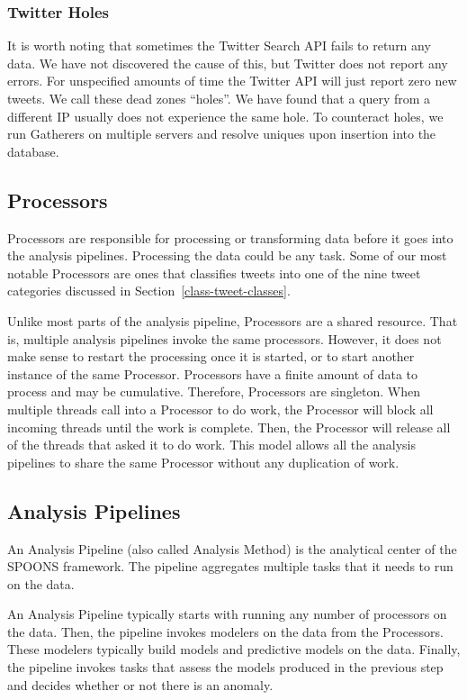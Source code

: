 \documentclass[12pt]{ucthesis}
\begin{document}
\subsubsection{Twitter Holes}
\label{arch-twitter-holes}
It is worth noting that sometimes the Twitter Search API fails to return any data. We have not discovered the cause
of this, but Twitter does not report any errors. For unspecified amounts of time the Twitter API will just report zero
new tweets. We call these dead zones ``holes''. We have found that a query from a different IP usually does not
experience the same hole. To counteract holes, we run Gatherers on multiple servers and resolve uniques upon insertion
into the database.

\subsection{Processors}
\label{arch-processors}
Processors are responsible for processing or transforming data before it goes into the analysis pipelines.
Processing the data could be any task. Some of our most notable Processors are ones that classifies tweets into one of
the nine tweet categories discussed in Section~\ref{class-tweet-classes}.

Unlike most parts of the analysis pipeline, Processors are a shared resource. That is, multiple analysis pipelines
invoke the same processors. However, it does not make sense to restart the processing once it is started, or to
start another instance of the same Processor. Processors have a finite amount of data to process and may be cumulative.
Therefore, Processors are singleton. When multiple threads call into a Processor to do work, the Processor will block
all incoming threads until the work is complete. Then, the Processor will release all of the threads that asked it to
do work. This model allows all the analysis pipelines to share the same Processor without any duplication of work.

\subsection{Analysis Pipelines}
\label{arch-pipelines}
An Analysis Pipeline (also called Analysis Method) is the analytical center of the SPOONS framework.
The pipeline aggregates multiple tasks that it needs to run on the data.

An Analysis Pipeline typically starts with running any number of processors on the data.
Then, the pipeline invokes modelers on the data from the Processors. These modelers typically build models and
predictive models on the data. Finally, the pipeline invokes tasks that assess the models produced in the previous
step and decides whether or not there is an anomaly.
\end{document}
